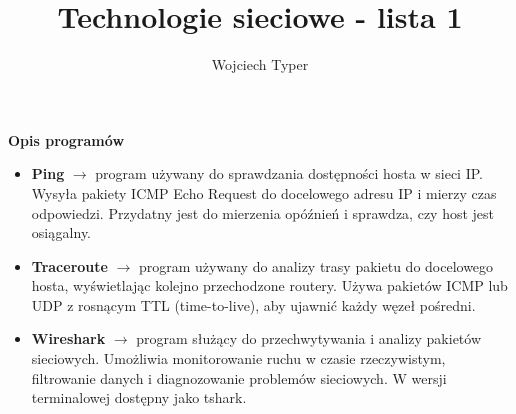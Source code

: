 \documentclass{article}
\title{Technologie sieciowe - lista 1}
\author{Wojciech Typer}
\date{}
\begin{document}
\maketitle

\vspace{1\baselineskip}

\textbf{Opis programów}
\begin{itemize}
  \item \textbf{Ping} $\rightarrow$ program używany do sprawdzania dostępności hosta w sieci IP.
  Wysyła pakiety ICMP Echo Request do docelowego adresu IP i mierzy czas odpowiedzi.
  Przydatny jest do mierzenia opóźnień i sprawdza, czy host jest osiągalny.
  \item \textbf{Traceroute} $\rightarrow$ program używany do analizy trasy pakietu do docelowego hosta,
  wyświetlając kolejno przechodzone routery. Używa pakietów ICMP lub UDP z rosnącym TTL (time-to-live),
  aby ujawnić każdy węzeł pośredni.
  \item \textbf{Wireshark} $\rightarrow$ program służący do przechwytywania i analizy pakietów sieciowych.
  Umożliwia monitorowanie ruchu w czasie rzeczywistym, filtrowanie danych i diagnozowanie problemów
  sieciowych. W wersji terminalowej dostępny jako tshark.
\end{itemize}
\end{document}
